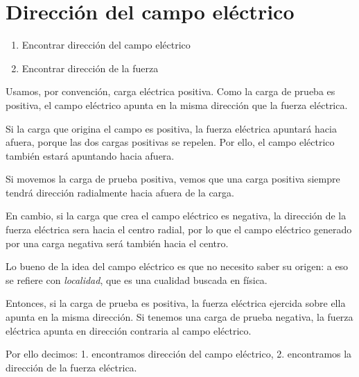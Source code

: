 \section{Dirección del campo eléctrico}

\begin{enumerate}
    \item Encontrar dirección del campo eléctrico
    \item Encontrar dirección de la fuerza
\end{enumerate}

Usamos,
por convención,
carga eléctrica positiva.
Como la carga de prueba es positiva,
el campo eléctrico apunta en la misma dirección que la fuerza eléctrica.

Si la carga que origina el campo es positiva,
la fuerza eléctrica apuntará hacia afuera,
porque las dos cargas positivas se repelen.
Por ello,
el campo eléctrico también estará apuntando hacia afuera.

Si movemos la carga de prueba positiva,
vemos que una carga positiva siempre tendrá dirección radialmente hacia afuera de la carga.

En cambio,
si la carga que crea el campo eléctrico es negativa,
la dirección de la fuerza eléctrica sera hacia el centro radial,
por lo que el campo eléctrico generado por una carga negativa será también hacia el centro.

Lo bueno de la idea del campo eléctrico es que no necesito saber su origen:
a eso se refiere con \textit{localidad},
que es una cualidad buscada en física.

Entonces,
si la carga de prueba es positiva,
la fuerza eléctrica ejercida sobre ella apunta en la misma dirección.
Si tenemos una carga de prueba negativa,
la fuerza eléctrica apunta en dirección contraria al campo eléctrico.

Por ello decimos:
1. encontramos dirección del campo eléctrico,
2. encontramos la dirección de la fuerza eléctrica.

